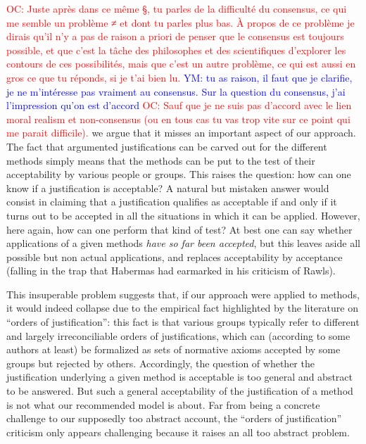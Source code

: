 \documentclass[preprint, french, english, 11pt, authoryear]{elsarticle}%
\newcommand{\commentYM}[1]{\textcolor{blue}{YM: #1}}
\newcommand{\commentOC}[1]{\textcolor{red}{OC: #1}}
\begin{document}
\commentOC{Juste après dans ce même §, tu parles de la difficulté du consensus, ce qui me semble un problème ≠ et dont tu parles plus bas. À propos de ce problème je dirais qu’il n’y a pas de raison a priori de penser que le consensus est toujours possible, et que c’est la tâche des philosophes et des scientifiques d’explorer les contours de ces possibilités, mais que c’est un autre problème, ce qui est aussi en gros ce que tu réponds, si je t’ai bien lu.}
\commentYM{tu as raison, il faut que je clarifie, je ne m'intéresse pas vraiment au consensus. Sur la question du consensus, j'ai l'impression qu'on est d'accord}
\commentOC{Sauf que je ne suis pas d’accord avec le lien moral realism et non-consensus (ou en tous cas tu vas trop vite sur ce point qui me parait difficile).}
we argue that it misses an important aspect of our approach. The fact that argumented justifications can be carved out for the different methods simply means that the methods can be put to the test of their acceptability by various people or groups. This raises the question: how can one know if a justification is acceptable? A natural but mistaken answer would consist in claiming that a justification qualifies as acceptable if and only if it turns out to be accepted in all the situations in which it can be applied. However, here again, how can one perform that kind of test? At best one can say whether applications of a given methods \emph{have so far been accepted}, but this leaves aside all possible but non actual applications, and replaces acceptability by acceptance (falling in the trap that Habermas had earmarked in his criticism of Rawls).

This insuperable problem suggests that, if our approach were applied to methods, it would indeed collapse due to the empirical fact highlighted by the literature on ``orders of justification'': this fact is that various groups typically refer to different and largely irreconciliable orders of justifications, which can (according to some authors at least) be formalized as sets of normative axioms accepted by some groups but rejected by others. Accordingly, the question of whether the justification underlying a given method is acceptable is too general and abstract to be answered. But such a general acceptability of the justification of a method is not what our recommended model is about. Far from being a concrete challenge to our supposedly too abstract account, the ``orders of justification'' criticism only appears challenging because it raises an all too abstract problem. 
\end{document}
